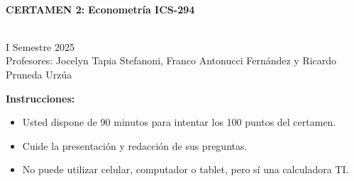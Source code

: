 \documentclass[10pt,a4paper]{article}
\begin{document}
\vspace{5cm}



\begin{center}
\begin{large}
\textbf{\\CERTAMEN 2:}
\textbf{Econometría ICS-294}
\end{large}\\
\vspace{0.2cm}
I Semestre 2025\\
Profesores: Jocelyn Tapia Stefanoni, Franco Antonucci Fernández y Ricardo Pruneda Urz\'ua\\
\end{center}

\textbf{Instrucciones:} 

\begin{itemize}

    \item Usted dispone de 90 minutos  para intentar los 100 puntos del certamen.
    \item Cuide la presentación y redacción de sus preguntas.
    \item No puede utilizar celular, computador o tablet, pero sí una calculadora TI.
     
\end{itemize}
\end{document}
